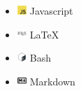 \documentclass{article}
\begin{document}
\begin{multicols}{3}
\begin{itemize}
    \item \includegraphics[height=10pt]{images/icons/javascript-original}
    Javascript
    \item \includegraphics[height=10pt]{images/icons/latex-original.png} LaTeX
    \item \includegraphics[height=10pt]{images/icons/bash-original.png} Bash
    \item \includegraphics[height=10pt]{images/icons/markdown-original.png} Markdown
\end{itemize}


\end{multicols}
\end{document}

